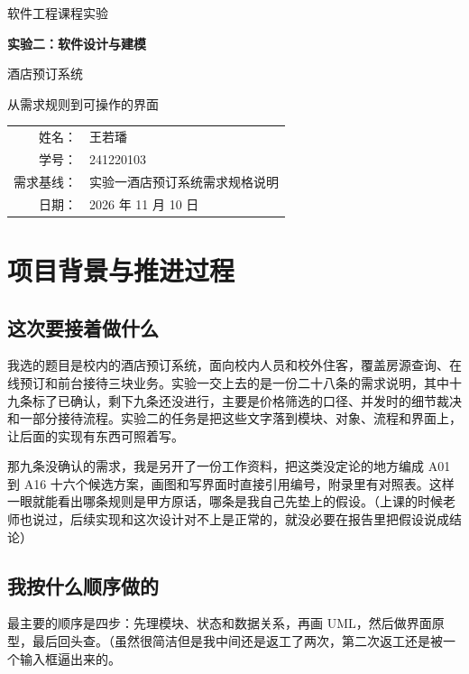 \documentclass[UTF8,a4paper,zihao=-4,fontset=none]{ctexart}
\begin{document}
\begin{titlepage}
\thispagestyle{empty}
\begin{center}
\vspace*{20mm}
{\Large 软件工程课程实验}\par
\vspace{18mm}
{\huge\bfseries 实验二：软件设计与建模}\par
\vspace{10mm}
{\LARGE 酒店预订系统}\par
\vspace{4mm}
{\large 从需求规则到可操作的界面}\par
\vspace{26mm}
\begin{tabular}{rl}
姓名：&王若璠\\[3mm]
学号：&241220103\\[3mm]
需求基线：&实验一酒店预订系统需求规格说明\\[3mm]
日期：&2026 年 11 月 10 日
\end{tabular}
\end{center}
\vfill
\end{titlepage}
\tableofcontents
\clearpage
{}

\section{项目背景与推进过程}
\subsection{这次要接着做什么}
我选的题目是校内的酒店预订系统，面向校内人员和校外住客，覆盖房源查询、在线预订和前台接待三块业务。实验一交上去的是一份二十八条的需求说明，其中十九条标了已确认，剩下九条还没进行，主要是价格筛选的口径、并发时的细节裁决和一部分接待流程。实验二的任务是把这些文字落到模块、对象、流程和界面上，让后面的实现有东西可照着写。

那九条没确认的需求，我是另开了一份工作资料，把这类没定论的地方编成 A01 到 A16 十六个候选方案，画图和写界面时直接引用编号，附录里有对照表。这样一眼就能看出哪条规则是甲方原话，哪条是我自己先垫上的假设。（上课的时候老师也说过，后续实现和这次设计对不上是正常的，就没必要在报告里把假设说成结论）

\subsection{我按什么顺序做的}
最主要的顺序是四步：先理模块、状态和数据关系，再画 UML，然后做界面原型，最后回头查。（虽然很简洁但是我中间还是返工了两次，第二次返工还是被一个输入框逼出来的。
\end{document}
